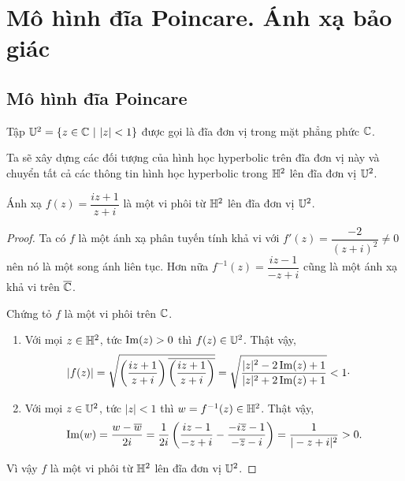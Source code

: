 \section{Mô hình đĩa Poincare. Ánh xạ bảo giác}
\subsection{Mô hình đĩa Poincare}
\begin{defn}
    Tập $\mathbb{U}^2 = \{z\in \mathbb{C} ~|~|z| < 1\}$ được gọi là đĩa đơn vị trong mặt phẳng phức $\mathbb{C}$.
\end{defn}
    Ta sẽ xây dựng các đối tượng của hình học hyperbolic trên đĩa đơn vị này và chuyển tất cả các thông tin hình học hyperbolic trong $\mathbb{H}^2$ lên đĩa đơn vị $\mathbb{U}^2$.

\begin{lem}\label{lem 2.3.2}
    Ánh xạ $f(z) = \dfrac{iz+1}{z+i}$ là một vi phôi từ $\mathbb{H}^2$ lên đĩa đơn vị $\mathbb{U}^2$.
\end{lem}
\begin{proof}
    Ta có $f$ là một ánh xạ phân tuyến tính khả vi với $f'(z) = \dfrac{-2}{(z+i)^2} \neq 0$ nên nó là một song ánh liên tục. Hơn nữa $f^{-1}(z) = \dfrac{iz-1}{-z+i}$ cũng là một ánh xạ khả vi trên $\overline{\mathbb{C}}$. 
    
    Chứng tỏ $f$ là một vi phôi trên $\mathbb{C}$.
     \begin{enumerate}
         \item Với mọi $z \in \mathbb{H}^2$, tức $\operatorname{Im}(z) >0$ thì $f(z) \in \mathbb{U}^2$.
         Thật vậy,
         \begin{align*}
            |f(z)| &=\sqrt{\left(\dfrac{iz+1}{z+i}\right)\overline{\left(\dfrac{iz+1}{z+i}\right)}}
             = \sqrt{\dfrac{|z|^2-2\operatorname{Im}(z) +1}{|z|^2+2\operatorname{Im}(z) +1}} < 1\cdot
        \end{align*}
        \item Với mọi $z \in \mathbb{U}^2$, tức $|z| < 1$ thì $w=f^{-1}(z) \in \mathbb{H}^2$. Thật vậy,
        \begin{align*}
            \operatorname{Im}(w) = \dfrac{w - \overline{w}}{2i} 
            = \dfrac{1}{2i}\left(\dfrac{iz-1}{-z+i} - \dfrac{-i\overline{z}-1}{-\overline{z}-i}\right)
            = \dfrac{1}{|-z+i|^2} > 0.
        \end{align*}
     \end{enumerate}
    Vì vậy $f$ là một vi phôi từ $\mathbb{H}^2$ lên đĩa đơn vị $\mathbb{U}^2$.
\end{proof}
